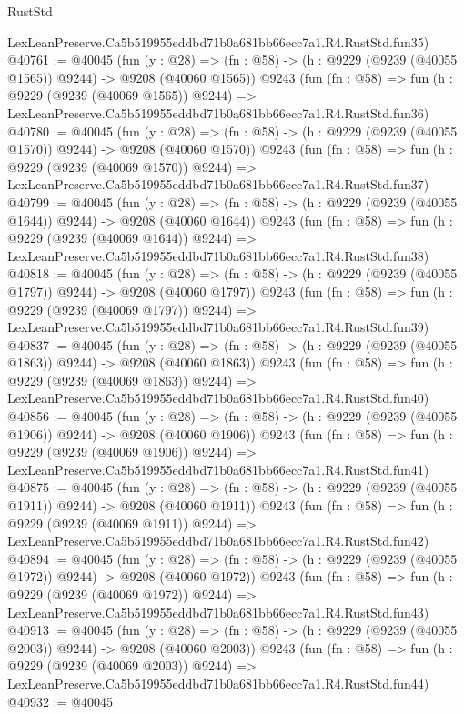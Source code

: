 \begin{lexlean}{RustStd}
\begin{coremodule}
    LexLeanPreserve.Ca5b519955eddbd71b0a681bb66ecc7a1.R4.RustStd.fun35)
@40761 := @40045
    (fun (y : @28) =>
    (fn : @58) -> (h : @9229 (@9239 (@40055 @1565)) @9244) -> @9208 (@40060 @1565))
    @9243
    (fun (fn : @58) =>
    fun (h : @9229 (@9239 (@40069 @1565)) @9244) =>
    LexLeanPreserve.Ca5b519955eddbd71b0a681bb66ecc7a1.R4.RustStd.fun36)
@40780 := @40045
    (fun (y : @28) =>
    (fn : @58) -> (h : @9229 (@9239 (@40055 @1570)) @9244) -> @9208 (@40060 @1570))
    @9243
    (fun (fn : @58) =>
    fun (h : @9229 (@9239 (@40069 @1570)) @9244) =>
    LexLeanPreserve.Ca5b519955eddbd71b0a681bb66ecc7a1.R4.RustStd.fun37)
@40799 := @40045
    (fun (y : @28) =>
    (fn : @58) -> (h : @9229 (@9239 (@40055 @1644)) @9244) -> @9208 (@40060 @1644))
    @9243
    (fun (fn : @58) =>
    fun (h : @9229 (@9239 (@40069 @1644)) @9244) =>
    LexLeanPreserve.Ca5b519955eddbd71b0a681bb66ecc7a1.R4.RustStd.fun38)
@40818 := @40045
    (fun (y : @28) =>
    (fn : @58) -> (h : @9229 (@9239 (@40055 @1797)) @9244) -> @9208 (@40060 @1797))
    @9243
    (fun (fn : @58) =>
    fun (h : @9229 (@9239 (@40069 @1797)) @9244) =>
    LexLeanPreserve.Ca5b519955eddbd71b0a681bb66ecc7a1.R4.RustStd.fun39)
@40837 := @40045
    (fun (y : @28) =>
    (fn : @58) -> (h : @9229 (@9239 (@40055 @1863)) @9244) -> @9208 (@40060 @1863))
    @9243
    (fun (fn : @58) =>
    fun (h : @9229 (@9239 (@40069 @1863)) @9244) =>
    LexLeanPreserve.Ca5b519955eddbd71b0a681bb66ecc7a1.R4.RustStd.fun40)
@40856 := @40045
    (fun (y : @28) =>
    (fn : @58) -> (h : @9229 (@9239 (@40055 @1906)) @9244) -> @9208 (@40060 @1906))
    @9243
    (fun (fn : @58) =>
    fun (h : @9229 (@9239 (@40069 @1906)) @9244) =>
    LexLeanPreserve.Ca5b519955eddbd71b0a681bb66ecc7a1.R4.RustStd.fun41)
@40875 := @40045
    (fun (y : @28) =>
    (fn : @58) -> (h : @9229 (@9239 (@40055 @1911)) @9244) -> @9208 (@40060 @1911))
    @9243
    (fun (fn : @58) =>
    fun (h : @9229 (@9239 (@40069 @1911)) @9244) =>
    LexLeanPreserve.Ca5b519955eddbd71b0a681bb66ecc7a1.R4.RustStd.fun42)
@40894 := @40045
    (fun (y : @28) =>
    (fn : @58) -> (h : @9229 (@9239 (@40055 @1972)) @9244) -> @9208 (@40060 @1972))
    @9243
    (fun (fn : @58) =>
    fun (h : @9229 (@9239 (@40069 @1972)) @9244) =>
    LexLeanPreserve.Ca5b519955eddbd71b0a681bb66ecc7a1.R4.RustStd.fun43)
@40913 := @40045
    (fun (y : @28) =>
    (fn : @58) -> (h : @9229 (@9239 (@40055 @2003)) @9244) -> @9208 (@40060 @2003))
    @9243
    (fun (fn : @58) =>
    fun (h : @9229 (@9239 (@40069 @2003)) @9244) =>
    LexLeanPreserve.Ca5b519955eddbd71b0a681bb66ecc7a1.R4.RustStd.fun44)
@40932 := @40045

\end{coremodule}
\end{lexlean}
